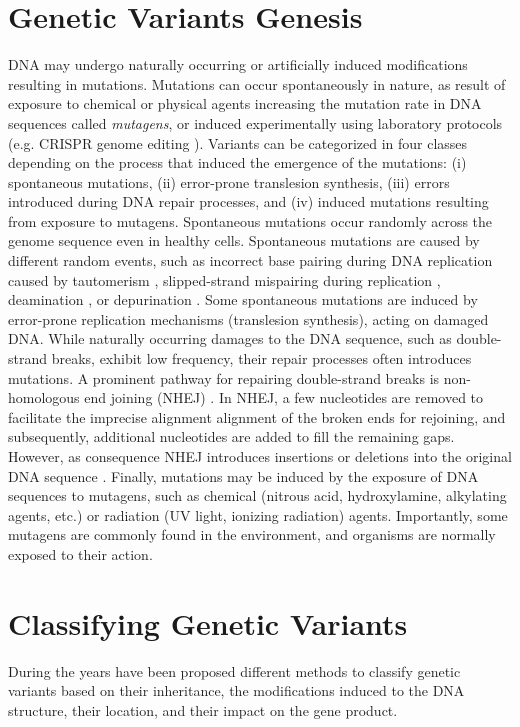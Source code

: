 \documentclass[a4paper, titlepage, openright]{book}
\begin{document}
\section{Genetic Variants Genesis}
DNA may undergo naturally occurring or artificially induced modifications resulting in mutations. Mutations can occur spontaneously in nature, as result of exposure to chemical or physical agents increasing the mutation rate in DNA sequences called \emph{mutagens}, or induced experimentally using laboratory protocols (e.g. CRISPR genome editing \citep{cong2013multiplex}). Variants can be categorized in four classes depending on the process that induced the emergence of the mutations: (i) spontaneous mutations, (ii) error-prone translesion synthesis, (iii) errors introduced during DNA repair processes, and (iv) induced mutations resulting from exposure to mutagens. Spontaneous mutations occur randomly across the genome sequence even in healthy cells. Spontaneous mutations are caused by different random events, such as incorrect base pairing during DNA replication caused by tautomerism \citep{podolyan2003ab}, slipped-strand mispairing during replication \citep{levinson1987slipped}, deamination \citep{duncan1980mutagenic}, or depurination \citep{kunkel1984mutational}. Some spontaneous mutations are induced by error-prone replication mechanisms (translesion synthesis), acting on damaged DNA. While naturally occurring damages to the DNA sequence, such as double-strand breaks, exhibit low frequency, their repair processes often introduces mutations. A prominent pathway for repairing double-strand breaks is non-homologous end joining (NHEJ) \citep{weterings2008endless}. In NHEJ, a few nucleotides are removed to facilitate the imprecise alignment alignment of the broken ends for rejoining, and subsequently, additional nucleotides are added to fill the remaining gaps. However, as consequence NHEJ introduces insertions or deletions into the original DNA sequence \citep{weterings2008endless}. Finally, mutations may be induced by the exposure of DNA sequences to mutagens, such as chemical (nitrous acid, hydroxylamine, alkylating agents, etc.) or radiation (UV light, ionizing radiation) agents. Importantly, some mutagens are commonly found in the environment, and organisms are normally exposed to their action.

\section{Classifying Genetic Variants}
During the years have been proposed different methods to classify genetic variants based on their inheritance, the modifications induced to the DNA structure, their location, and their impact on the gene product.
\end{document}
